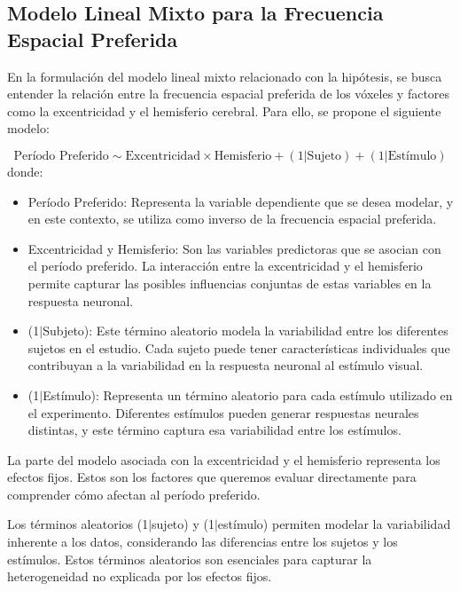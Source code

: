 \subsection{Modelo Lineal Mixto para la Frecuencia Espacial Preferida}

En la formulación del modelo lineal mixto relacionado con la hip\'otesis, se busca entender la relación entre la frecuencia espacial preferida de los vóxeles y factores como la excentricidad y el hemisferio cerebral. Para ello, se propone el siguiente modelo:

\begin{equation}
	\text{Período Preferido} \sim  \text{Excentricidad} \times \text{Hemisferio} + (1|\text{Sujeto}) + (1|\text{Estímulo})	
	\label{mlm_pp}
\end{equation}
donde:
\begin{itemize}
	\item Período Preferido: Representa la variable dependiente que se desea modelar, y en este contexto, se utiliza como inverso de la frecuencia espacial preferida.
	
	\item Excentricidad y Hemisferio: Son las variables predictoras que se asocian con el período preferido. La interacción entre la excentricidad y el hemisferio permite capturar las posibles influencias conjuntas de estas variables en la respuesta neuronal.
	
	\item (1$|$Subjeto): Este término aleatorio modela la variabilidad entre los diferentes sujetos en el estudio. Cada sujeto puede tener características individuales que contribuyan a la variabilidad en la respuesta neuronal al estímulo visual.

	\item (1$|$Est\'imulo): Representa un término aleatorio para cada estímulo utilizado en el experimento. Diferentes estímulos pueden generar respuestas neurales distintas, y este término captura esa variabilidad entre los estímulos.
	
\end{itemize}

La parte del modelo asociada con la excentricidad y el hemisferio representa los efectos fijos. Estos son los factores que queremos evaluar directamente para comprender cómo afectan al período preferido.

Los términos aleatorios (1$|$sujeto) y (1$|$estímulo) permiten modelar la variabilidad inherente a los datos, considerando las diferencias entre los sujetos y los estímulos. Estos términos aleatorios son esenciales para capturar la heterogeneidad no explicada por los efectos fijos.


